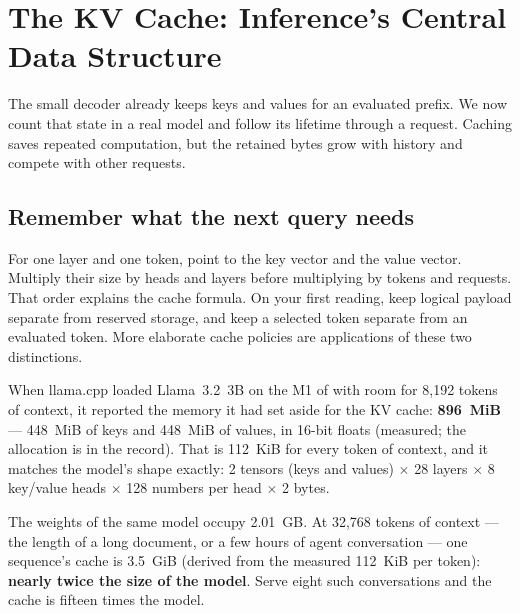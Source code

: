 \chapter{The KV Cache: Inference's Central Data Structure}\label{ch:kv-cache}

\begin{ChapterIntent}
The small decoder already keeps keys and values for an evaluated prefix. We now count
that state in a real model and follow its lifetime through a request. Caching saves
repeated computation, but the retained bytes grow with history and compete with other
requests.
\end{ChapterIntent}

\section*{Remember what the next query needs}
For one layer and one token, point to the key vector and the value vector. Multiply
their size by heads and layers before multiplying by tokens and requests. That order
explains the cache formula. On your first reading, keep logical payload separate from
reserved storage, and keep a selected token separate from an evaluated token. More
elaborate cache policies are applications of these two distinctions.


When llama.cpp loaded Llama~3.2~3B on the M1 of  with room for
8,192 tokens of context, it reported the memory it had set aside for the KV
cache: \textbf{896~MiB} --- 448~MiB of keys and 448~MiB of values, in 16-bit
floats (measured; the allocation is in the record). That is 112~KiB for every
token of context, and it matches the model's shape exactly: 2 tensors (keys and
values) $\times$ 28 layers $\times$ 8 key/value heads $\times$ 128 numbers per
head $\times$ 2 bytes.

The weights of the same model occupy 2.01~GB. At 32,768 tokens of context ---
the length of a long document, or a few hours of agent conversation --- one
sequence's cache is 3.5~GiB (derived from the measured 112~KiB per token):
\textbf{nearly twice the size of the model}. Serve eight such conversations
and the cache is fifteen times the model.

